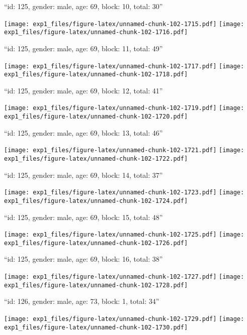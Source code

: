 \documentclass[11pt,,]{article}
\begin{document}
\newpage
[1] 

``id: 125, gender: male, age: 69, block: 10, total: 30''

\texttt{[image: exp1\_files/figure-latex/unnamed-chunk-102-1715.pdf]}
\texttt{[image: exp1\_files/figure-latex/unnamed-chunk-102-1716.pdf]}

\newpage
[1] 

``id: 125, gender: male, age: 69, block: 11, total: 49''

\texttt{[image: exp1\_files/figure-latex/unnamed-chunk-102-1717.pdf]}
\texttt{[image: exp1\_files/figure-latex/unnamed-chunk-102-1718.pdf]}

\newpage
[1] 

``id: 125, gender: male, age: 69, block: 12, total: 41''

\texttt{[image: exp1\_files/figure-latex/unnamed-chunk-102-1719.pdf]}
\texttt{[image: exp1\_files/figure-latex/unnamed-chunk-102-1720.pdf]}

\newpage
[1] 

``id: 125, gender: male, age: 69, block: 13, total: 46''

\texttt{[image: exp1\_files/figure-latex/unnamed-chunk-102-1721.pdf]}
\texttt{[image: exp1\_files/figure-latex/unnamed-chunk-102-1722.pdf]}

\newpage
[1] 

``id: 125, gender: male, age: 69, block: 14, total: 37''

\texttt{[image: exp1\_files/figure-latex/unnamed-chunk-102-1723.pdf]}
\texttt{[image: exp1\_files/figure-latex/unnamed-chunk-102-1724.pdf]}

\newpage
[1] 

``id: 125, gender: male, age: 69, block: 15, total: 48''

\texttt{[image: exp1\_files/figure-latex/unnamed-chunk-102-1725.pdf]}
\texttt{[image: exp1\_files/figure-latex/unnamed-chunk-102-1726.pdf]}

\newpage
[1] 

``id: 125, gender: male, age: 69, block: 16, total: 38''

\texttt{[image: exp1\_files/figure-latex/unnamed-chunk-102-1727.pdf]}
\texttt{[image: exp1\_files/figure-latex/unnamed-chunk-102-1728.pdf]}

\newpage
[1] 

``id: 126, gender: male, age: 73, block: 1, total: 34''

\texttt{[image: exp1\_files/figure-latex/unnamed-chunk-102-1729.pdf]}
\texttt{[image: exp1\_files/figure-latex/unnamed-chunk-102-1730.pdf]}
\end{document}
